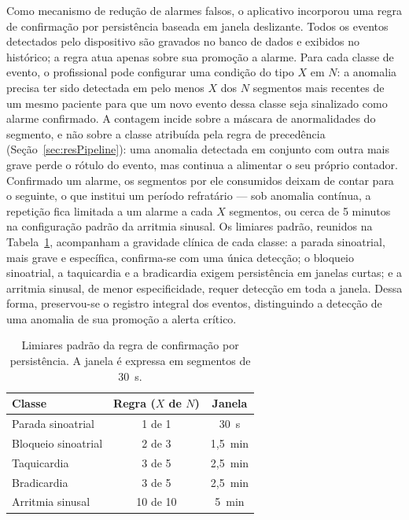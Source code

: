 Como mecanismo de redução de alarmes falsos, o aplicativo incorporou uma regra de confirmação por persistência baseada em janela deslizante. Todos os eventos detectados pelo dispositivo são gravados no banco de dados e exibidos no histórico; a regra atua apenas sobre sua promoção a alarme. Para cada classe de evento, o profissional pode configurar uma condição do tipo $X$ em $N$: a anomalia precisa ter sido detectada em pelo menos $X$ dos $N$ segmentos mais recentes de um mesmo paciente para que um novo evento dessa classe seja sinalizado como alarme confirmado. A contagem incide sobre a máscara de anormalidades do segmento, e não sobre a classe atribuída pela regra de precedência (Seção~\ref{sec:resPipeline}): uma anomalia detectada em conjunto com outra mais grave perde o rótulo do evento, mas continua a alimentar o seu próprio contador. Confirmado um alarme, os segmentos por ele consumidos deixam de contar para o seguinte, o que institui um período refratário --- sob anomalia contínua, a repetição fica limitada a um alarme a cada $X$ segmentos, ou cerca de 5 minutos na configuração padrão da arritmia sinusal. Os limiares padrão, reunidos na Tabela~\ref{tab:alarmePadrao}, acompanham a gravidade clínica de cada classe: a parada sinoatrial, mais grave e específica, confirma-se com uma única detecção; o bloqueio sinoatrial, a taquicardia e a bradicardia exigem persistência em janelas curtas; e a arritmia sinusal, de menor especificidade, requer detecção em toda a janela. Dessa forma, preservou-se o registro integral dos eventos, distinguindo a detecção de uma anomalia de sua promoção a alerta crítico.

\begin{table}[h]
    \centering
    \caption{Limiares padrão da regra de confirmação por persistência. A janela é expressa em segmentos de 30~s.}
    \begin{tabular}{l|c|c}
        \textbf{Classe} & \textbf{Regra ($X$ de $N$)} & \textbf{Janela} \\ \hline
        Parada sinoatrial   & 1 de 1   & 30~s \\ \hline
        Bloqueio sinoatrial & 2 de 3   & 1,5~min \\ \hline
        Taquicardia         & 3 de 5   & 2,5~min \\ \hline
        Bradicardia         & 3 de 5   & 2,5~min \\ \hline
        Arritmia sinusal    & 10 de 10 & 5~min \\
    \end{tabular}
    \label{tab:alarmePadrao}
\end{table}

